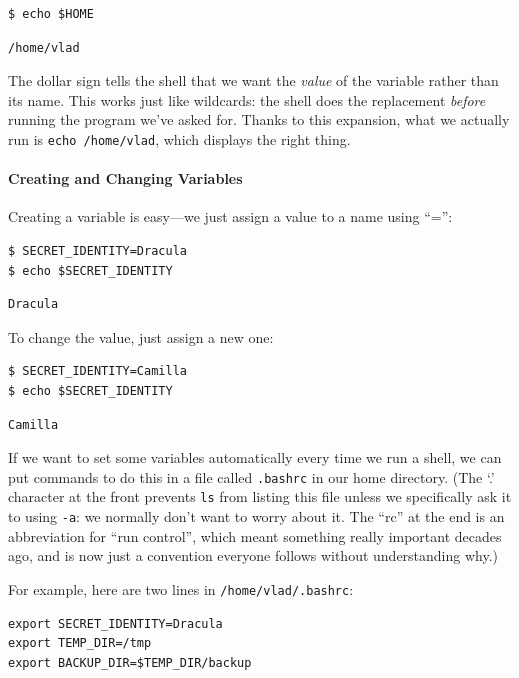 \documentclass[]{book}
\begin{document}
\begin{verbatim}
$ echo $HOME
\end{verbatim}

\begin{verbatim}
/home/vlad
\end{verbatim}

The dollar sign tells the shell that we want the \emph{value} of the
variable rather than its name. This works just like wildcards: the shell
does the replacement \emph{before} running the program we've asked for.
Thanks to this expansion, what we actually run is
\texttt{echo /home/vlad}, which displays the right thing.

\mbox{}\paragraph{Creating and Changing Variables}

Creating a variable is easy---we just assign a value to a name using
``='':

\begin{verbatim}
$ SECRET_IDENTITY=Dracula
$ echo $SECRET_IDENTITY
\end{verbatim}

\begin{verbatim}
Dracula
\end{verbatim}

To change the value, just assign a new one:

\begin{verbatim}
$ SECRET_IDENTITY=Camilla
$ echo $SECRET_IDENTITY
\end{verbatim}

\begin{verbatim}
Camilla
\end{verbatim}

If we want to set some variables automatically every time we run a
shell, we can put commands to do this in a file called \texttt{.bashrc}
in our home directory. (The `.' character at the front prevents
\texttt{ls} from listing this file unless we specifically ask it to
using \texttt{-a}: we normally don't want to worry about it. The ``rc''
at the end is an abbreviation for ``run control'', which meant something
really important decades ago, and is now just a convention everyone
follows without understanding why.)

For example, here are two lines in \texttt{/home/vlad/.bashrc}:

\begin{verbatim}
export SECRET_IDENTITY=Dracula
export TEMP_DIR=/tmp
export BACKUP_DIR=$TEMP_DIR/backup
\end{verbatim}
\end{document}
